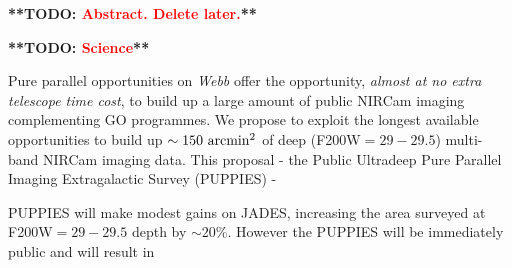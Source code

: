 \documentclass[12pt]{article}
\newcommand{\todo}[1]{\textbf{**TODO: \textcolor{red}{#1}**}}
\begin{document}
%
%






\todo{Abstract. Delete later.}


\todo{Science}

Pure parallel opportunities on \emph{Webb} offer the opportunity, \emph{almost at no extra telescope time cost}, to build up a large amount of public NIRCam imaging complementing GO programmes. We propose to exploit the longest available opportunities to build up $\sim 150\ {\rm arcmin^2}$ of deep (F200W$=29-29.5$) multi-band NIRCam imaging data. This proposal - the Public Ultradeep Pure Parallel Imaging Extragalactic Survey (PUPPIES) - 

PUPPIES will make modest gains on JADES, increasing the area surveyed at F200W$=29-29.5$ depth by $\sim 20\%$. However the PUPPIES will be immediately public and will result in 




\end{document}
